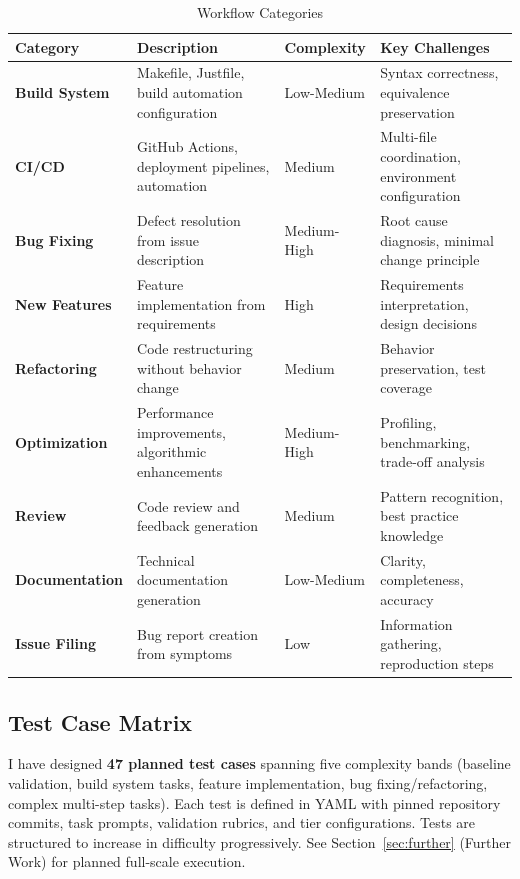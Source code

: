 \documentclass[11pt]{article}
\begin{document}
\begin{table}[htbp]
\centering
\caption{Workflow Categories}
\begin{tabularx}{\textwidth}{lXlX}
\toprule
Category & Description & Complexity & Key Challenges \\
\midrule
\textbf{Build System} & Makefile, Justfile, build automation configuration & Low-Medium & Syntax correctness, equivalence preservation \\
\textbf{CI/CD} & GitHub Actions, deployment pipelines, automation & Medium & Multi-file coordination, environment configuration \\
\textbf{Bug Fixing} & Defect resolution from issue description & Medium-High & Root cause diagnosis, minimal change principle \\
\textbf{New Features} & Feature implementation from requirements & High & Requirements interpretation, design decisions \\
\textbf{Refactoring} & Code restructuring without behavior change & Medium & Behavior preservation, test coverage \\
\textbf{Optimization} & Performance improvements, algorithmic enhancements & Medium-High & Profiling, benchmarking, trade-off analysis \\
\textbf{Review} & Code review and feedback generation & Medium & Pattern recognition, best practice knowledge \\
\textbf{Documentation} & Technical documentation generation & Low-Medium & Clarity, completeness, accuracy \\
\textbf{Issue Filing} & Bug report creation from symptoms & Low & Information gathering, reproduction steps \\
\bottomrule
\end{tabularx}
\end{table}


\subsection{Test Case Matrix}

I have designed \textbf{47 planned test cases} spanning five complexity bands (baseline validation, build system tasks, feature implementation, bug fixing/refactoring, complex multi-step tasks). Each test is defined in YAML with pinned repository commits, task prompts, validation rubrics, and tier configurations. Tests are structured to increase in difficulty progressively. See Section~\ref{sec:further} (Further Work) for planned full-scale execution.
\end{document}
